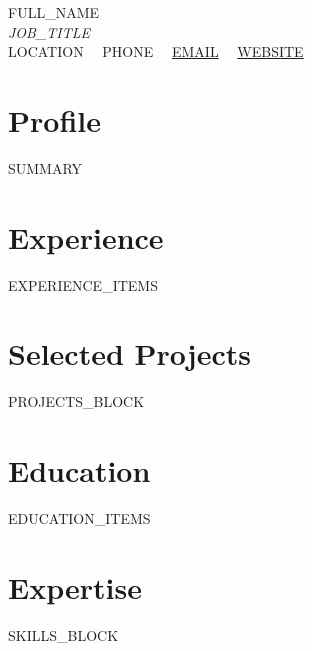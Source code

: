 \documentclass[10pt,letterpaper]{article}
\begin{document}
{\LARGE \textsc{{{FULL_NAME}}}} \\[4pt]
{\small \textit{{{JOB_TITLE}}}} \\[6pt]
\small
{{LOCATION}} \ \textperiodcentered \ 
{{PHONE}} \ \textperiodcentered \ 
\href{mailto:{{EMAIL}}}{{{EMAIL}}} \ \textperiodcentered \ 
\href{https://{{WEBSITE}}}{{{WEBSITE}}}

\vspace{10pt}

\section{Profile}
\small
{{SUMMARY}}

\vspace{4pt}
\section{Experience}
\small
{{EXPERIENCE_ITEMS}}

\vspace{4pt}
\section{Selected Projects}
\small
{{PROJECTS_BLOCK}}

\vspace{4pt}
\section{Education}
\small
{{EDUCATION_ITEMS}}

\vspace{4pt}
\section{Expertise}
\small
{{SKILLS_BLOCK}}
\end{document}
